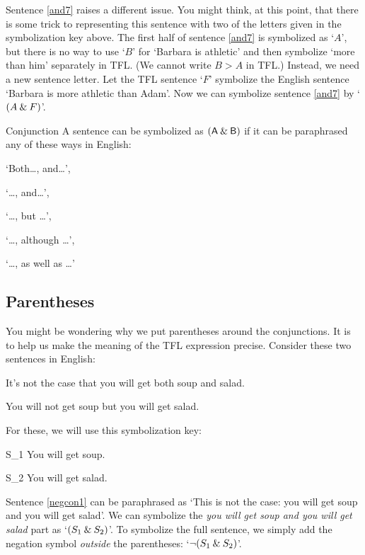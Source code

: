 Sentence \ref{and7} raises a different issue. You might think, at this point, that there is some trick to representing this sentence with two of the letters given in the symbolization key above. The first half of sentence \ref{and7} is symbolized as `$A$', but there is no way to use `$B$' for `Barbara is athletic' and then symbolize `more than him' separately in TFL. (We cannot write $B > A$ in TFL.) Instead, we need a new sentence letter. Let the TFL sentence `$F$' symbolize the English sentence `Barbara is more athletic than Adam'. Now we can symbolize sentence \ref{and7} by `$(A \mathbin{\&} F)$'.

\begin{factboxy}{Conjunction}
A sentence can be symbolized as $(\mathsf{A}\mathbin{\&}\mathsf{B})$ if it can be paraphrased any of these ways in English:
\vspace{-2mm}
\begin{earg}
\item[] `Both\ldots, and\ldots',
\item[] `\ldots, and\ldots',
\item[] `\ldots, but \ldots', 
\item[] `\ldots, although \ldots',
\item[] `\ldots, as well as \ldots'
\end{earg}
\end{factboxy}
	
\subsection{Parentheses}
	
You might be wondering why we put parentheses around the conjunctions. It is to help us make the meaning of the TFL expression precise. Consider these two sentences in English:
	\begin{earg}
		\item[\ex{negcon1}] It's not the case that you will get both soup and salad.
		\item[\ex{negcon2}] You will not get soup but you will get salad.
	\end{earg}
For these, we will use this symbolization key:
	\begin{ekey}
		\item[S_1] You will get soup.
		\item[S_2] You will get salad.
	\end{ekey}
Sentence \ref{negcon1} can be paraphrased as `This is not the case: you will get soup and you will get salad'. We can symbolize the \textit{you will get soup and you will get salad} part as `$(S_1 \mathbin{\&} S_2)$'. To symbolize the full sentence, we simply add the negation symbol \textit{outside} the parentheses: `${\neg} (S_1 \mathbin{\&} S_2)$'. 

